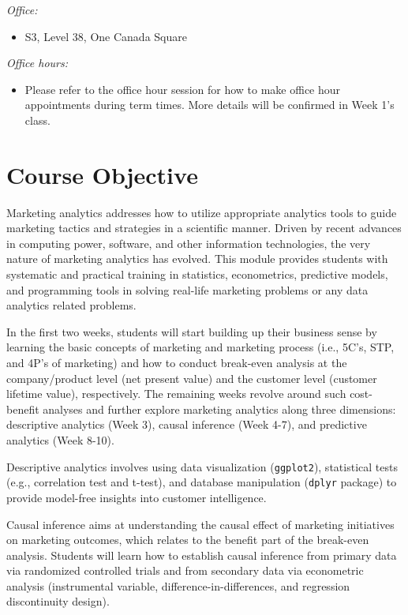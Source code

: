 \documentclass[
  11pt,
]{book}
\providecommand{\tightlist}{%
  \setlength{\itemsep}{0pt}\setlength{\parskip}{0pt}}
\begin{document}
\emph{Office:}

\begin{itemize}
\tightlist
\item
  S3, Level 38, One Canada Square
\end{itemize}

\emph{Office hours:}

\begin{itemize}
\tightlist
\item
  Please refer to the office hour session for how to make office hour appointments during term times. More details will be confirmed in Week 1's class.
\end{itemize}

\hypertarget{course-objective}{%
\section{Course Objective}\label{course-objective}}

Marketing analytics addresses how to utilize appropriate analytics tools to guide marketing tactics and strategies in a scientific manner. Driven by recent advances in computing power, software, and other information technologies, the very nature of marketing analytics has evolved. This module provides students with systematic and practical training in statistics, econometrics, predictive models, and programming tools in solving real-life marketing problems or any data analytics related problems.

In the first two weeks, students will start building up their business sense by learning the basic concepts of marketing and marketing process (i.e., 5C's, STP, and 4P's of marketing) and how to conduct break-even analysis at the company/product level (net present value) and the customer level (customer lifetime value), respectively. The remaining weeks revolve around such cost-benefit analyses and further explore marketing analytics along three dimensions: descriptive analytics (Week 3), causal inference (Week 4-7), and predictive analytics (Week 8-10).

Descriptive analytics involves using data visualization (\texttt{ggplot2}), statistical tests (e.g., correlation test and t-test), and database manipulation (\texttt{dplyr} package) to provide model-free insights into customer intelligence.

Causal inference aims at understanding the causal effect of marketing initiatives on marketing outcomes, which relates to the benefit part of the break-even analysis. Students will learn how to establish causal inference from primary data via randomized controlled trials and from secondary data via econometric analysis (instrumental variable, difference-in-differences, and regression discontinuity design).
\end{document}
